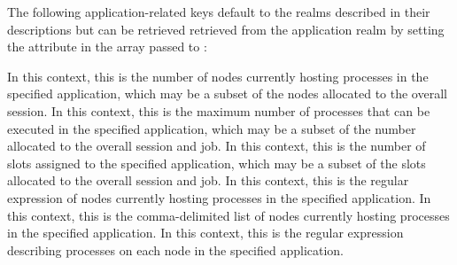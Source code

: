 %
%
%
%
%

\vspace{\baselineskip}

The following application-related keys default to the realms described in their descriptions but can be
retrieved retrieved from the application realm by setting the  attribute in the  array passed to :

In this context, this is the number of
nodes currently hosting processes in the specified application, which may be a
subset of the nodes allocated to the overall session.
\pasteAttributeItemEnd{}
%
In this context, this is the maximum number of processes that can be executed in the specified application, which may be a subset of the number allocated to the overall session and job.
\pasteAttributeItemEnd{}
%
In this context, this is the number of
slots assigned to the specified application, which may be a subset of the slots
allocated to the overall session and job.
\pasteAttributeItemEnd{}
%
In this context, this is the regular expression of nodes currently hosting processes in the specified application.
\pasteAttributeItemEnd{}
%
In this context, this is the comma-delimited list of nodes currently hosting processes in the specified application.
\pasteAttributeItemEnd{}
%
In this context, this is the regular expression describing processes on each node in the specified application.
\pasteAttributeItemEnd{}

